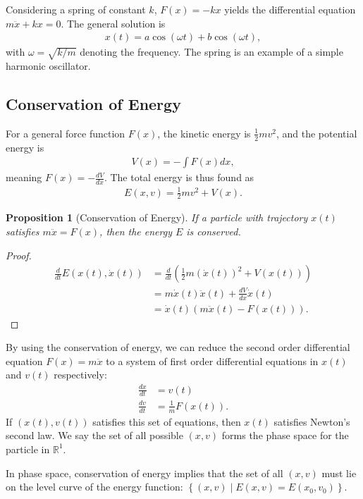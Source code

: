 \documentclass[10pt]{extarticle}
\newcommand{\R}{\mathbb{R}}
\newcommand{\set}[1]{\left\{#1\right\}}
\theoremstyle{plain}
\newtheorem*{proposition}{Proposition}%
\theoremstyle{definition}
\theoremstyle{remark}
\renewcommand{\newline}{\hfill\break}
\begin{document}
  Considering a spring of constant $k$, $F(x) = -kx$ yields the differential equation $m\ddot{x} + kx = 0$. The general solution is
  \begin{align*}
    x(t) = a\cos(\omega t) + b\cos(\omega t),
  \end{align*}
  with $\omega = \sqrt{k/m}$ denoting the frequency. The spring is an example of a simple harmonic oscillator.
  \subsection{Conservation of Energy}%
  For a general force function $F(x)$, the kinetic energy is $\frac{1}{2}mv^2$, and the potential energy is
  \begin{align*}
    V(x) = -\int F(x)dx,
  \end{align*}
  meaning $F(x) = -\frac{dV}{dx}$. The total energy is thus found as
  \begin{align*}
    E(x,v) = \frac{1}{2}mv^2 + V(x).
  \end{align*}
  \begin{proposition}[Conservation of Energy]
  If a particle with trajectory $x(t)$ satisfies $m\ddot{x} = F(x)$, then the energy $E$ is conserved.
  \end{proposition}
  \begin{proof}
    \begin{align*}
      \frac{d}{dt}E(x(t),\dot{x}(t)) &= \frac{d}{dt}\left(\frac{1}{2}m(\dot{x}(t))^2 + V(x(t))\right)\\
                                     &= m\dot{x}(t)\ddot{x}(t) + \frac{dV}{dx}\dot{x}(t)\\
                                     &= \dot{x}(t)\left(m\ddot{x}(t) - F(x(t))\right).
    \end{align*}
  \end{proof}
  By using the conservation of energy, we can reduce the second order differential equation $F(x) = m\ddot{x}$ to a system of first order differential equations in $x(t)$ and $v(t)$ respectively:
  \begin{align*}
    \frac{dx}{dt} &= v(t)\\
    \frac{dv}{dt} &= \frac{1}{m}F(x(t)).
  \end{align*}
  If $(x(t),v(t))$ satisfies this set of equations, then $x(t)$ satisfies Newton's second law. We say the set of all possible $(x,v)$ forms the phase space for the particle in $\R^1$.\newline

  In phase space, conservation of energy implies that the set of all $(x,v)$ must lie on the level curve of the energy function: $\set{(x,v)\mid E(x,v) = E(x_0,v_0)}$.\newline
\end{document}
